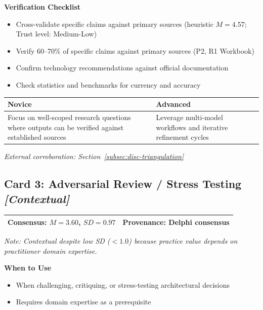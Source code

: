 \textbf{Verification Checklist}
\begin{itemize}[label=\checkbox]
    \item Cross-validate specific claims against primary sources (heuristic $M = 4.57$; Trust level: Medium-Low)
    \item Verify 60--70\% of specific claims against primary sources (P2, R1 Workbook)
    \item Confirm technology recommendations against official documentation
    \item Check statistics and benchmarks for currency and accuracy
\end{itemize}

\begin{tabular}{|p{6.5cm}|p{6.5cm}|}
    \hline
    \textbf{Novice} & \textbf{Advanced} \\
    \hline
    Focus on well-scoped research questions where outputs can be verified against established sources & Leverage multi-model workflows and iterative refinement cycles \\
    \hline
\end{tabular}

\vspace{0.5em}
\textit{External corroboration: Section~\ref{subsec:disc-triangulation}}

\clearpage
\subsection*{Card 3: Adversarial Review / Stress Testing \hfill \textit{[Contextual]}}

\begin{tabular}{|p{7cm}|p{6cm}|}
    \hline
    \textbf{Consensus:} $M = 3.60$, $SD = 0.97$ & \textbf{Provenance:} Delphi consensus \\
    \hline
\end{tabular}

\vspace{0.3em}
\noindent\textit{Note: Contextual despite low SD ($< 1.0$) because practice value depends on practitioner domain expertise.}

\vspace{0.5em}
\textbf{When to Use}
\begin{itemize}
    \item When challenging, critiquing, or stress-testing architectural decisions
    \item Requires domain expertise as a prerequisite
\end{itemize}

